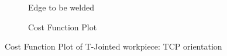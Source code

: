 \begin{figure}[!htbp] %
	\centering
	\begin{subfigure}[b]{0.4\textwidth}
		\caption{Edge to be welded}  
		\label{fig:cp1b}
	\end{subfigure}
	\begin{subfigure}[b]{0.4\textwidth}
		\caption{Cost Function Plot}  
	\label{fig:cp1a}
	\end{subfigure}	
	\caption{Cost Function Plot of T-Jointed workpiece: TCP orientation}
	\label{fig:cp1}
\end{figure}
